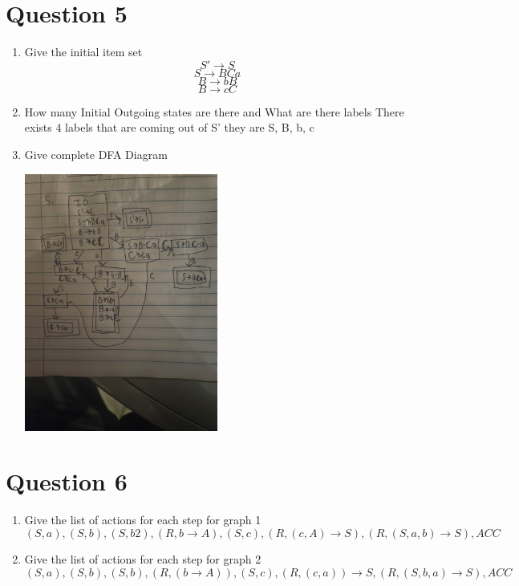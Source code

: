 \documentclass{article}
\begin{document}
    \section*{Question 5}
    \begin{enumerate}
	\item Give the initial item set
		\[S' \rightarrow S\]
		\[S \rightarrow BCa\]
		\[ B \rightarrow bB\]
		\[ B \rightarrow cC\]
	\item How many Initial Outgoing states are there and What are there labels
	There exists 4 labels that are coming out of S' they are S, B, b, c
	\item Give complete DFA Diagram
	\begin{center}
            \includegraphics[width=0.5\textwidth, angle=0]{figures/DFA4.jpg}
	\end{center}
    \end{enumerate}
    \section*{Question 6}
    \begin{enumerate}
	\item Give the list of actions for each step for graph 1
		\[(S, a),(S, b),(S, b2),(R, b \rightarrow A),(S, c),(R, (c, A) \rightarrow S),(R, (S, a, b) \rightarrow S),ACC\]
	\item Give the list of actions for each step for graph 2
		\[(S, a),(S, b), (S, b), (R, (b \rightarrow A)), (S, c),  (R, (c, a))\rightarrow S, (R, (S,b,a) \rightarrow S),ACC\]

    \end{enumerate}
\end{document}
